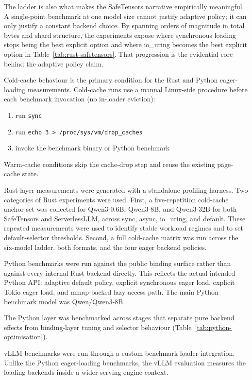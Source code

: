 The ladder is also what makes the SafeTensors narrative empirically meaningful. A single-point benchmark at one model size cannot justify adaptive policy; it can only justify a constant backend choice. By spanning orders of magnitude in total bytes and shard structure, the experiments expose where synchronous loading stops being the best explicit option and where io\_uring becomes the best explicit option in Table~\ref{tab:rust-safetensors}. That progression is the evidential core behind the adaptive policy claim.

Cold-cache behaviour is the primary condition for the Rust and Python eager-loading measurements. Cold-cache runs use a manual Linux-side procedure before each benchmark invocation (no in-loader eviction):

\begin{enumerate}
\item run \texttt{sync}
\item run \texttt{echo 3 > /proc/sys/vm/drop\_caches}
\item invoke the benchmark binary or Python benchmark
\end{enumerate}

Warm-cache conditions skip the cache-drop step and reuse the existing page-cache state.

Rust-layer measurements were generated with a standalone profiling harness. Two categories of Rust experiments were used. First, a five-repetition cold-cache anchor set was collected for Qwen3-0.6B, Qwen3-8B, and Qwen3-32B for both SafeTensors and ServerlessLLM, across sync, async, io\_uring, and default. These repeated measurements were used to identify stable workload regimes and to set default-selector thresholds. Second, a full cold-cache matrix was run across the six-model ladder, both formats, and the four eager backend policies.

Python benchmarks were run against the public binding surface rather than against every internal Rust backend directly. This reflects the actual intended Python API: adaptive default policy, explicit synchronous eager load, explicit Tokio eager load, and mmap-backed lazy access path. The main Python benchmark model was Qwen/Qwen3-8B.

The Python layer was benchmarked across stages that separate pure backend effects from binding-layer tuning and selector behaviour (Table~\ref{tab:python-optimisation}).

vLLM benchmarks were run through a custom benchmark loader integration. Unlike the Python eager-loading benchmarks, the vLLM evaluation measures the loading backends inside a wider serving-engine context.

